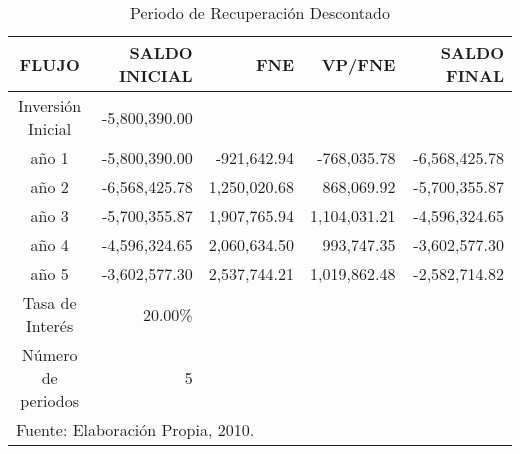 \begin{table}
    \caption{Periodo de Recuperación Descontado}
    \label{tbl:Recuperacion:Descontado}
    \centering
    \begin{tabular}{c|r|r|r|r}
        FLUJO              & SALDO INICIAL & FNE          & VP/FNE         & SALDO FINAL \\
        \hline
        \hline
        Inversión Inicial  & -5,800,390.00 &              &                &  \\
        \hline
        año 1              & -5,800,390.00 & -921,642.94  & -768,035.78    & -6,568,425.78 \\
        año 2              & -6,568,425.78 & 1,250,020.68 & 868,069.92     & -5,700,355.87 \\
        año 3              & -5,700,355.87 & 1,907,765.94 & 1,104,031.21   & -4,596,324.65 \\
        año 4              & -4,596,324.65 & 2,060,634.50 & 993,747.35     & -3,602,577.30 \\
        año 5              & -3,602,577.30 & 2,537,744.21 & 1,019,862.48   & -2,582,714.82 \\
        \hline
        Tasa de Interés    & 20.00\% \\
        Número de periodos & 5 \\
        \hline
        \multicolumn{5}{l}{\footnotesize Fuente: Elaboración Propia, 2010.}
    \end{tabular}
\end{table}

















